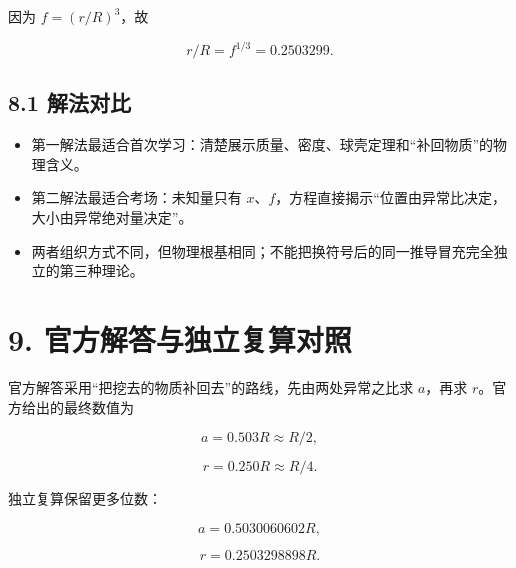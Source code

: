 \documentclass[
  11pt,
  UTF8]{ctexart}
\providecommand{\tightlist}{%
  \setlength{\itemsep}{0pt}\setlength{\parskip}{0pt}}
\begin{document}
因为 \(f=(r/R)^3\)，故

\[r/R=f^{1/3}=0.2503299.\]

\hypertarget{ux89e3ux6cd5ux5bf9ux6bd4}{%
\subsection{8.1 解法对比}\label{ux89e3ux6cd5ux5bf9ux6bd4}}

\begin{itemize}
\tightlist
\item
  第一解法最适合首次学习：清楚展示质量、密度、球壳定理和``补回物质''的物理含义。
\item
  第二解法最适合考场：未知量只有
  \(x\)、\(f\)，方程直接揭示``位置由异常比决定，大小由异常绝对量决定''。
\item
  两者组织方式不同，但物理根基相同；不能把换符号后的同一推导冒充完全独立的第三种理论。
\end{itemize}

\hypertarget{ux5b98ux65b9ux89e3ux7b54ux4e0eux72ecux7acbux590dux7b97ux5bf9ux7167}{%
\section{9.
官方解答与独立复算对照}\label{ux5b98ux65b9ux89e3ux7b54ux4e0eux72ecux7acbux590dux7b97ux5bf9ux7167}}

官方解答采用``把挖去的物质补回去''的路线，先由两处异常之比求 \(a\)，再求
\(r\)。官方给出的最终数值为

\[a=0.503R≈R/2,\]

\[r=0.250R≈R/4.\]

独立复算保留更多位数：

\[a=0.5030060602R,\]

\[r=0.2503298898R.\]
\end{document}

